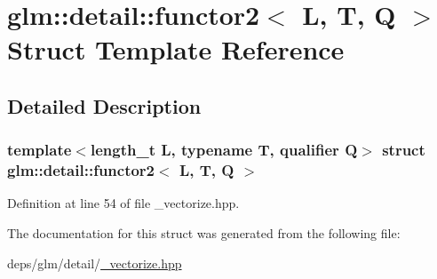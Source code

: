 \hypertarget{structglm_1_1detail_1_1functor2}{}\section{glm\+:\+:detail\+:\+:functor2$<$ L, T, Q $>$ Struct Template Reference}
\label{structglm_1_1detail_1_1functor2}


\subsection{Detailed Description}
\subsubsection*{template$<$length\+\_\+t L, typename T, qualifier Q$>$\newline
struct glm\+::detail\+::functor2$<$ L, T, Q $>$}



Definition at line 54 of file \+\_\+vectorize.\+hpp.



The documentation for this struct was generated from the following file\+:\begin{DoxyCompactItemize}
\item 
deps/glm/detail/\hyperlink{__vectorize_8hpp}{\+\_\+vectorize.\+hpp}\end{DoxyCompactItemize}
